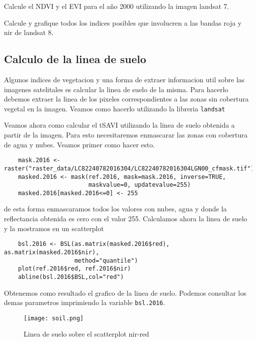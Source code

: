 \begin{act}
    Calcule el NDVI y el EVI para el año 2000 utilizando la imagen landsat 7.
\end{act}

\begin{act}
    Calcule y grafique todos los indices posibles que involucren a las bandas
    roja y nir de landsat 8. 
\end{act}

\subsection{Calculo de la linea de suelo}

Algunos indices de vegetacion y una forma de extraer informacion util sobre las
imagenes satelitales es calcular la linea de suelo de la misma. Para hacerlo
debemos extraer la linea de los pixeles correspondientes a las zonas sin
cobertura vegetal en la imagen. Veamos como hacerlo utilizando la libreria
\texttt{landsat}

\begin{exa}
    Veamos ahora como calcular el tSAVI utilizando la linea de suelo obtenida a
    partir de la imagen. Para esto necesitaremos enmascarar las zonas con
    cobertura de agua y nubes. Veamos primer como hacer esto.
    \begin{lstlisting}
    mask.2016 <- raster("raster_data/LC82240782016304/LC82240782016304LGN00_cfmask.tif")
    masked.2016 <- mask(ref.2016, mask=mask.2016, inverse=TRUE,
                        maskvalue=0, updatevalue=255)
    masked.2016[masked.2016<=0] <- 255
    \end{lstlisting}
    de esta forma enmascaramos todos los valores con nubes, agua y donde la
    reflectancia obtenida es cero con el valor 255.
    Calculamos ahora la linea de suelo y la mostramos en un scatterplot
    \begin{lstlisting}
    bsl.2016 <- BSL(as.matrix(masked.2016$red), as.matrix(masked.2016$nir),
                    method="quantile")
    plot(ref.2016$red, ref.2016$nir)
    abline(bsl.2016$BSL,col="red")
    \end{lstlisting}
    Obtenemos como resultado el grafico de la linea de suelo. Podemos consultar
    los demas parametros imprimiendo la variable \texttt{bsl.2016}.
    \begin{figure}
    \begin{center}
        \texttt{[image: soil.png]}
    \end{center}
    \caption{Linea de suelo sobre el scatterplot nir-red}
    \label{fig:soil}
    \end{figure}
    
\end{exa}

